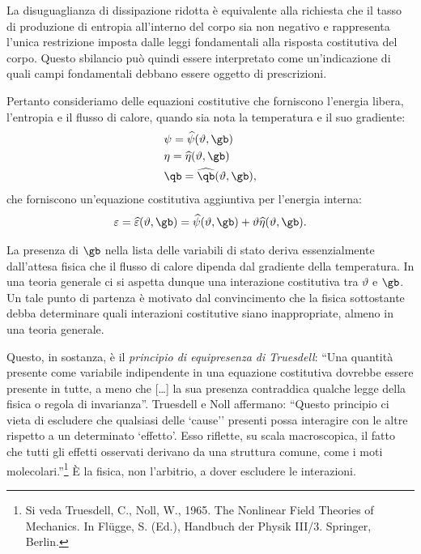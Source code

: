 La disuguaglianza di dissipazione ridotta è equivalente alla richiesta che il tasso di produzione di entropia all'interno del corpo sia non negativo e rappresenta l'unica restrizione imposta dalle leggi fondamentali alla risposta costitutiva  del corpo. Questo sbilancio può quindi essere interpretato come un'indicazione di quali campi fondamentali debbano essere oggetto di prescrizioni. 

Pertanto consideriamo delle equazioni costitutive che forniscono l'energia libera, l'entropia e il flusso di calore, quando sia nota la temperatura e il suo gradiente:
\begin{equation}
\begin{aligned}
&	\psi=\widehat{\psi}(\vartheta, \gb)\\
&\eta=\widehat{\eta}(\vartheta, \gb)\\
&\qb=\widehat{\qb}(\vartheta, \gb),\\
\end{aligned}
\end{equation}
che forniscono un'equazione costitutiva aggiuntiva per l'energia interna:
\begin{equation}
\varepsilon=\widehat{\varepsilon}(\vartheta, \gb)=\widehat{\psi}(\vartheta, \gb)+\vartheta\widehat{\eta}(\vartheta, \gb).
\end{equation}

\begin{remark}
	La presenza di $\gb$ nella lista delle variabili di stato deriva essenzialmente dall'attesa fisica che il flusso di calore dipenda dal gradiente della temperatura. In una teoria generale ci si aspetta dunque una interazione costitutiva tra $\vartheta$ e $\gb$. Un tale punto di partenza è motivato dal convincimento che la fisica sottostante debba determinare quali interazioni costitutive siano inappropriate, almeno in una teoria generale. 
	
Questo, in sostanza, è il \textit{principio di equipresenza di Truesdell}:  ``Una quantità presente come variabile indipendente in una equazione costitutiva dovrebbe essere presente in tutte, a meno che [\ldots] la sua presenza contraddica qualche legge della fisica o regola di invarianza''.  Truesdell e Noll  affermano: ``Questo principio ci vieta di escludere che qualsiasi delle `cause'' presenti possa interagire con le altre rispetto a un determinato `effetto'. Esso riflette, su scala macroscopica, il fatto che tutti gli effetti osservati derivano da una struttura comune, come i moti molecolari.''\footnote{Si veda Truesdell, C., Noll, W., 1965. The Nonlinear Field Theories of Mechanics. In Fl\"{u}gge, S. (Ed.), Handbuch der Physik III/3. Springer, Berlin.} È la fisica, non l'arbitrio, a dover escludere le interazioni.
	

\end{remark}

